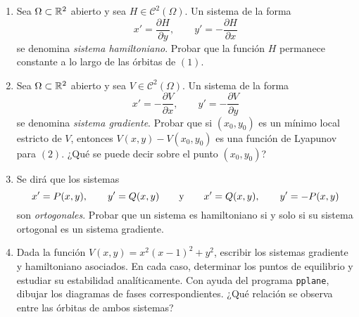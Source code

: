 \documentclass[11pt]{report}
\begin{document}
\begin{exercise}[Junio de 2023]
    \hfill
    \begin{enumerate}
        \item Sea $\Omega \subset \mathbb R^2$ abierto y sea $H \in \mathcal{C}^2(\Omega)$. Un sistema de la forma
        \begin{equation}
            x' = \frac{\partial H}{\partial y}, \qquad y' = -\frac{\partial H}{\partial x}
        \end{equation}
        se denomina \emph{sistema hamiltoniano}. Probar que la función $H$ permanece constante a lo largo de las órbitas de $(1)$.
        \item Sea $\Omega\subset\mathbb R^2$ abierto y sea $V\in\mathcal{C}^2(\Omega)$. Un sistema de la forma
        \begin{equation}
            x' = -\frac{\partial V}{\partial x}, \qquad y' = -\frac{\partial V}{\partial y}
        \end{equation}
        se denomina \emph{sistema gradiente}. Probar que si $(x_0,y_0)$ es un mínimo local estricto de $V$, entonces $V(x,y)-V(x_0,y_0)$ es una función de Lyapunov para $(2)$. ¿Qué se puede decir sobre el punto $(x_0,y_0)$?
        \item Se dirá que los sistemas
        \[x' = P(x,y), \qquad y' = Q(x,y) \qquad \textup{y} \qquad x' = Q(x,y), \qquad y' = -P(x,y)\]
        son \emph{ortogonales}. Probar que un sistema es hamiltoniano si y solo si su sistema ortogonal es un sistema gradiente.
        \item Dada la función $V(x,y) = x^2(x-1)^2+y^2$, escribir los sistemas gradiente y hamiltoniano asociados. En cada caso, determinar los puntos de equilibrio y estudiar su estabilidad analíticamente. Con ayuda del programa \texttt{pplane}, dibujar los diagramas de fases correspondientes. ¿Qué relación se observa entre las órbitas de ambos sistemas?
    \end{enumerate}
\end{exercise}
\end{document}
